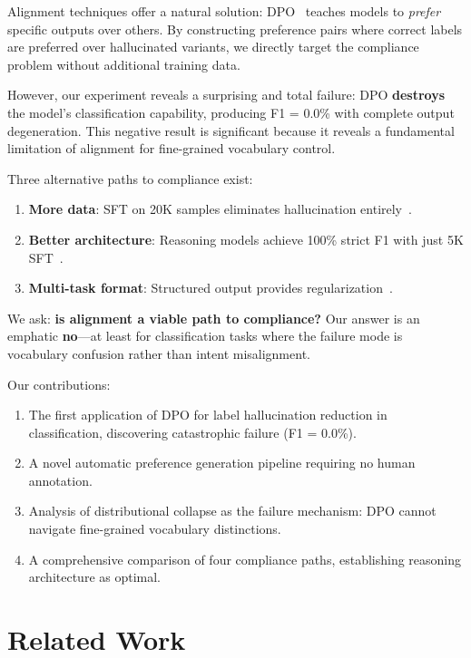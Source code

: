 \documentclass[journal]{IEEEtran}
\begin{document}
Alignment techniques offer a natural solution: DPO~\cite{rafailov2023} teaches models to \emph{prefer} specific outputs over others. By constructing preference pairs where correct labels are preferred over hallucinated variants, we directly target the compliance problem without additional training data.

However, our experiment reveals a surprising and total failure: DPO \textbf{destroys} the model's classification capability, producing F1 = 0.0\% with complete output degeneration. This negative result is significant because it reveals a fundamental limitation of alignment for fine-grained vocabulary control.

Three alternative paths to compliance exist:
\begin{enumerate}
\item \textbf{More data}: SFT on 20K samples eliminates hallucination entirely~\cite{p6}.
\item \textbf{Better architecture}: Reasoning models achieve 100\% strict F1 with just 5K SFT~\cite{p21}.
\item \textbf{Multi-task format}: Structured output provides regularization~\cite{p15}.
\end{enumerate}

We ask: \textbf{is alignment a viable path to compliance?} Our answer is an emphatic \textbf{no}---at least for classification tasks where the failure mode is vocabulary confusion rather than intent misalignment.

Our contributions:
\begin{enumerate}
\item The first application of DPO for label hallucination reduction in classification, discovering catastrophic failure (F1 = 0.0\%).
\item A novel automatic preference generation pipeline requiring no human annotation.
\item Analysis of distributional collapse as the failure mechanism: DPO cannot navigate fine-grained vocabulary distinctions.
\item A comprehensive comparison of four compliance paths, establishing reasoning architecture as optimal.
\end{enumerate}

\section{Related Work}
\end{document}
